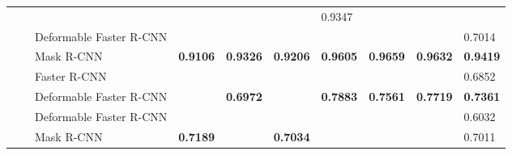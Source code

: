 \documentclass{ieeeaccess}
\begin{document}
\begin{table*}
\begin{tabularx}{\linewidth}{|u|u|t|v|v|k|v|v|k|k|}
        \footnotesize {}&
        \footnotesize {}&
        \footnotesize {}&
        \footnotesize {}&
        \footnotesize {}&
        \footnotesize {}&
        \footnotesize {0.9347} \\
         & &\footnotesize  Deformable Faster R-CNN&
        \footnotesize {}&
        \footnotesize {}&
        \footnotesize {}&
        \footnotesize {}&
        \footnotesize {}&
        \footnotesize {}&
        \footnotesize {0.7014} \\
        & &\footnotesize  Mask R-CNN&
        \footnotesize \centering \textbf{0.9106}&
        \footnotesize \centering \textbf{0.9326}&
        \footnotesize \centering \textbf{0.9206}&
        \footnotesize \centering \textbf{0.9605}&
        \footnotesize \centering \textbf{0.9659}&
        \footnotesize \centering \textbf{0.9632}&
        \footnotesize \textbf{0.9419} \\
        & \footnotesize {}&
        \footnotesize  Faster R-CNN&
        \footnotesize {}&
        \footnotesize {}&
        \footnotesize {}&
        \footnotesize {}&
        \footnotesize {}&
        \footnotesize {}&
        \footnotesize 
        {0.6852} \\
        & &\footnotesize  Deformable Faster R-CNN &
        \footnotesize {}&
        \footnotesize \centering \textbf{0.6972}&
        \footnotesize {}&
        \footnotesize \centering \textbf{0.7883}&
        \footnotesize \centering \textbf{0.7561}&
        \footnotesize \centering \textbf{0.7719}&
        \footnotesize \textbf{0.7361} \\
         & &\footnotesize  Deformable Faster R-CNN&
        \footnotesize {}&
        \footnotesize {}&
        \footnotesize {}&
        \footnotesize {}&
        \footnotesize {}&
        \footnotesize {}&
        \footnotesize {0.6032} \\
        & &\footnotesize  Mask R-CNN&
        \footnotesize \centering \textbf{0.7189}&
        \footnotesize {}&
        \footnotesize \centering \textbf{0.7034}&
        \footnotesize {}&
        \footnotesize {}&
        \footnotesize {}&
        \footnotesize 
        {0.7011} \\
        

\end{tabularx}
\end{table*}
\end{document}

